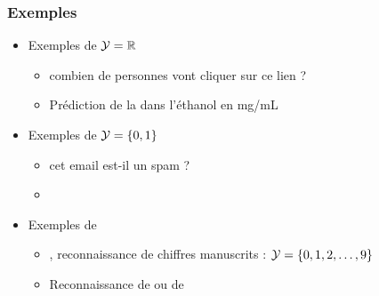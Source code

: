 \begin{frame}
  \frametitle{Exemples}
  \begin{itemize}
  \item Exemples de   $\mathcal{Y} = {\mathbb R}$ 
    \begin{itemize}
    \item {} combien de personnes vont cliquer sur ce lien ?
    \item Prédiction de la  dans l'éthanol en mg/mL
    \end{itemize}
  \pause
  \item Exemples de   $\mathcal{Y} = \{0, 1\}$
    \begin{itemize}
    \item {} cet email est-il un spam ?
    \item {} 
    \end{itemize}
  \pause
  \item Exemples de   
    \begin{itemize}
    \item {}, reconnaissance de chiffres manuscrits : $\mathcal{Y} = \{0, 1, 2, \dots, 9\}$
    \item Reconnaissance de  ou de 
    \end{itemize} 
  \end{itemize}
\end{frame}

